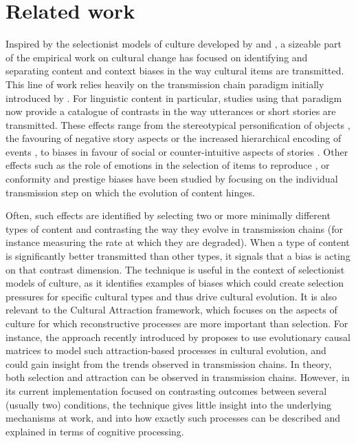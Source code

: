 \section{Related work}\label{sec:gistr-related}

Inspired by the selectionist models of culture developed by
\textcite{boyd_culture_1985} and
\textcite{cavalli-sforza_cultural_1981}, a sizeable part of the
empirical work on cultural change has focused on identifying and separating content and
context biases in the way cultural items are transmitted. This line of
work relies heavily on the transmission chain paradigm initially
introduced by \textcite{bartlett_remembering:_1995}. For linguistic
content in particular, studies using that paradigm now provide a
catalogue of contrasts in the way utterances or short stories are
transmitted. These effects range from the stereotypical personification
of objects \autocite{bangerter_transformation_2000}, the favouring of
negative story aspects \autocite{bebbington_sky_2017} or the increased
hierarchical encoding of events \autocite{mesoudi_hierarchical_2004}, to
biases in favour of social \autocite{mesoudi_bias_2006} or
counter-intuitive aspects of stories
\autocites{norenzayan_memory_2006}{barrett_spreading_2001}. Other
effects such as the role of emotions in the selection of items to
reproduce \autocites{heath_emotional_2001}{eriksson_corpses_2014}, or
conformity and prestige biases \autocite{acerbi_did_2017} have been
studied by focusing on the individual transmission step on which the
evolution of content hinges.

Often, such effects are identified by selecting two or more minimally
different types of content and contrasting the way they evolve in
transmission chains (for instance measuring the rate at which they are
degraded). When a type of content is significantly better transmitted
than other types, it signals that a bias is acting on that contrast
dimension. The technique is useful in the context of selectionist models
of culture, as it identifies examples of biases which could create
selection pressures for specific cultural types and thus drive cultural
evolution. It is also relevant to the Cultural Attraction framework,
which focuses on the aspects of culture for which reconstructive
processes are more important than selection. For instance, the approach
recently introduced by \textcite{claidiere_how_2014} proposes to
use evolutionary causal matrices to model such attraction-based
processes in cultural evolution, and could gain insight from the trends
observed in transmission chains.
In theory,
both selection and attraction can be observed in transmission chains. However, in
its current implementation focused on contrasting outcomes between
several (usually two) conditions, the technique gives little insight
into the underlying mechanisms at work, and into how exactly such processes
can be described and explained in terms of cognitive %
processing.

